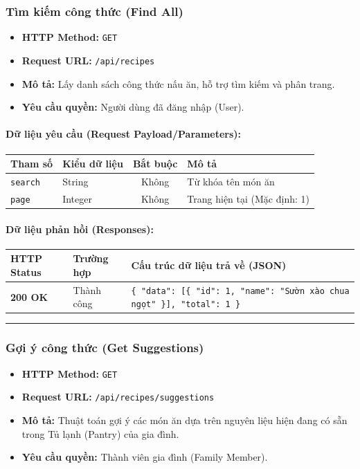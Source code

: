 \documentclass[12pt,a4paper]{article}
\begin{document}
\subsubsection{Tìm kiếm công thức (Find All)}
\begin{itemize}[leftmargin=*]
    \item \textbf{HTTP Method:} \texttt{GET}
    \item \textbf{Request URL:} \texttt{/api/recipes}
    \item \textbf{Mô tả:} Lấy danh sách công thức nấu ăn, hỗ trợ tìm kiếm và phân trang.
    \item \textbf{Yêu cầu quyền:} Người dùng đã đăng nhập (User).
\end{itemize}

\paragraph{Dữ liệu yêu cầu (Request Payload/Parameters):}
\begin{longtable}{|>{\raggedright\arraybackslash}p{2.8cm}|>{\raggedright\arraybackslash}p{2.2cm}|c|>{\raggedright\arraybackslash}p{7.0cm}|}
\hline
\textbf{Tham số} & \textbf{Kiểu dữ liệu} & \textbf{Bắt buộc} & \textbf{Mô tả} \\ \hline
\endhead
\texttt{search} & String & Không & Từ khóa tên món ăn \\ \hline
\texttt{page} & Integer & Không & Trang hiện tại (Mặc định: 1) \\ \hline
\end{longtable}

\paragraph{Dữ liệu phản hồi (Responses):}
\begin{longtable}{|>{\raggedright\arraybackslash}p{2.8cm}|>{\raggedright\arraybackslash}p{3.2cm}|>{\raggedright\arraybackslash}p{8.0cm}|}
\hline
\textbf{HTTP Status} & \textbf{Trường hợp} & \textbf{Cấu trúc dữ liệu trả về (JSON)} \\ \hline
\endhead
\textbf{200 OK} & Thành công & \texttt{\{ "data": [\{ "id": 1, "name": "Sườn xào chua ngọt" \}], "total": 1 \}} \\ \hline
\end{longtable}

\vskip 0.4cm
\noindent\rule{\textwidth}{0.3pt}
\vskip 0.4cm

\subsubsection{Gợi ý công thức (Get Suggestions)}
\begin{itemize}[leftmargin=*]
    \item \textbf{HTTP Method:} \texttt{GET}
    \item \textbf{Request URL:} \texttt{/api/recipes/suggestions}
    \item \textbf{Mô tả:} Thuật toán gợi ý các món ăn dựa trên nguyên liệu hiện đang có sẵn trong Tủ lạnh (Pantry) của gia đình.
    \item \textbf{Yêu cầu quyền:} Thành viên gia đình (Family Member).
\end{itemize}
\end{document}
